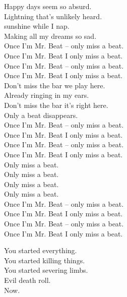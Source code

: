 Happy days seem so absurd. \\
Lightning that's unlikely heard. \\
 sunshine while I nap. \\
Making all my dreams so sad. \\

Once I'm Mr. Beat -- only miss a beat. \\
Once I'm Mr. Beat I only miss a beat. \\
Once I'm Mr. Beat -- only miss a beat. \\
Once I'm Mr. Beat I only miss a beat. \\

Don't miss the bar we play here. \\
Already ringing in my ears. \\
Don't miss the bar it's right here. \\
Only a beat disappears. \\

Once I'm Mr. Beat -- only miss a beat. \\
Once I'm Mr. Beat I only miss a beat. \\
Once I'm Mr. Beat -- only miss a beat. \\
Once I'm Mr. Beat I only miss a beat. \\

Only miss a beat. \\
Only miss a beat. \\
Only miss a beat. \\
Only miss a beat. \\

Once I'm Mr. Beat -- only miss a beat. \\
Once I'm Mr. Beat I only miss a beat. \\
Once I'm Mr. Beat -- only miss a beat. \\
Once I'm Mr. Beat I only miss a beat. \\




You started everything. \\
You started killing things. \\
You started severing limbs. \\

Evil death roll. \\
Now. \\

